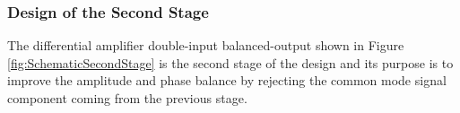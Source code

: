 
%
\clearpage
\subsubsection{Design of the Second Stage}
%
The differential amplifier double-input balanced-output shown in Figure \ref{fig:SchematicSecondStage} is the second stage of the design and its purpose is to improve the amplitude and phase balance by rejecting the common mode signal component coming from the previous stage.
